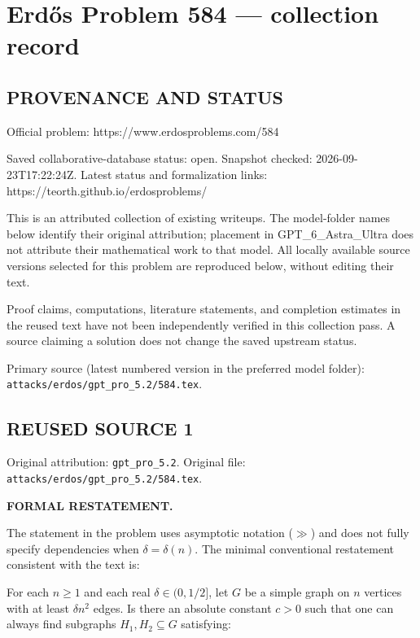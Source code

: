 \section*{Erd\H{o}s Problem 584 --- collection record}

\subsection*{PROVENANCE AND STATUS}
Official problem: https://www.erdosproblems.com/584

Saved collaborative-database status: open.
Snapshot checked: 2026-09-23T17:22:24Z.
Latest status and formalization links: https://teorth.github.io/erdosproblems/

This is an attributed collection of existing writeups. The model-folder names below identify their original attribution; placement in GPT\_6\_Astra\_Ultra does not attribute their mathematical work to that model. All locally available source versions selected for this problem are reproduced below, without editing their text.

Proof claims, computations, literature statements, and completion estimates in the reused text have not been independently verified in this collection pass. A source claiming a solution does not change the saved upstream status.

Primary source (latest numbered version in the preferred model folder): \texttt{attacks/erdos/gpt\_pro\_5.2/584.tex}.

\subsection*{REUSED SOURCE 1}
Original attribution: \texttt{gpt\_pro\_5.2}.
Original file: \texttt{attacks/erdos/gpt\_pro\_5.2/584.tex}.


\noindent\textbf{FORMAL RESTATEMENT.}

The statement in the problem uses asymptotic notation ($\gg$) and does not fully specify dependencies when $\delta=\delta(n)$.
The minimal conventional restatement consistent with the text is:

For each $n\ge 1$ and each real $\delta\in(0,1/2]$, let $G$ be a simple graph on $n$ vertices with at least $\delta n^2$ edges.
Is there an absolute constant $c>0$ such that one can always find subgraphs $H_1,H_2\subseteq G$ satisfying:

